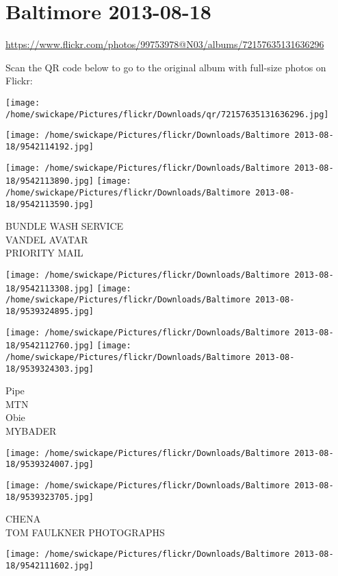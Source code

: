 \documentclass[10pt,letterpaper]{article}
\title{}
\author{}
\date{}
\begin{document}
\section*{Baltimore 2013-08-18}

\url{https://www.flickr.com/photos/99753978@N03/albums/72157635131636296}

Scan the QR code below to go to the original album with full-size photos on Flickr:

\texttt{[image: /home/swickape/Pictures/flickr/Downloads/qr/72157635131636296.jpg]}
\pagebreak

\texttt{[image: /home/swickape/Pictures/flickr/Downloads/Baltimore 2013-08-18/9542114192.jpg]}

\vspace{0.25in}
\texttt{[image: /home/swickape/Pictures/flickr/Downloads/Baltimore 2013-08-18/9542113890.jpg]}
\texttt{[image: /home/swickape/Pictures/flickr/Downloads/Baltimore 2013-08-18/9542113590.jpg]}

BUNDLE WASH SERVICE\\
VANDEL AVATAR\\
PRIORITY MAIL
\pagebreak

\texttt{[image: /home/swickape/Pictures/flickr/Downloads/Baltimore 2013-08-18/9542113308.jpg]}
\texttt{[image: /home/swickape/Pictures/flickr/Downloads/Baltimore 2013-08-18/9539324895.jpg]}

\texttt{[image: /home/swickape/Pictures/flickr/Downloads/Baltimore 2013-08-18/9542112760.jpg]}
\texttt{[image: /home/swickape/Pictures/flickr/Downloads/Baltimore 2013-08-18/9539324303.jpg]}

Pipe\\
MTN\\
Obie\\
MYBADER
\pagebreak

\texttt{[image: /home/swickape/Pictures/flickr/Downloads/Baltimore 2013-08-18/9539324007.jpg]}

\vspace{0.25in}
\texttt{[image: /home/swickape/Pictures/flickr/Downloads/Baltimore 2013-08-18/9539323705.jpg]}

CHENA\\
TOM FAULKNER PHOTOGRAPHS
\pagebreak

\texttt{[image: /home/swickape/Pictures/flickr/Downloads/Baltimore 2013-08-18/9542111602.jpg]}
\end{document}
